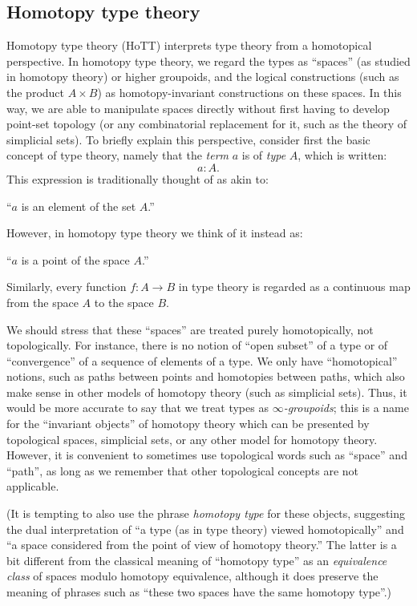 \subsection*{Homotopy type theory}

Homotopy type theory (HoTT) interprets type theory from a homotopical perspective.
In homotopy type theory, we regard the types as ``spaces'' (as studied in homotopy theory) or higher groupoids, and the logical constructions (such as the product $A\times B$) as homotopy-invariant constructions on these spaces.
In this way, we are able to manipulate spaces directly without first having to develop point-set topology (or any combinatorial replacement for it, such as the theory of simplicial sets).
To briefly explain this perspective, consider first the basic concept of type theory, namely that
the \emph{term} $a$ is of \emph{type} $A$, which is written:
\[ a:A. \]
This expression is traditionally thought of as akin to:
\begin{center}
``$a$ is an element of the set $A$.''
\end{center}
However, in homotopy type theory we think of it instead as:
\begin{center}
``$a$ is a point of the space $A$.''
\end{center}
%
Similarly, every function $f : A\to B$ in type theory is regarded as a continuous map from the space $A$ to the space $B$.

We should stress that these ``spaces'' are treated purely homotopically, not topologically.
For instance, there is no notion of ``open subset'' of a type or of ``convergence'' of a sequence of elements of a type.
We only have ``homotopical'' notions, such as paths between points and homotopies between paths, which also make sense in other models of homotopy theory (such as simplicial sets).
Thus, it would be more accurate to say that we treat types as \emph{$\infty$-groupoids}; this is a name for the ``invariant objects'' of homotopy theory which can be presented by topological spaces,
%
simplicial sets, or any other model for homotopy theory.
However, it is convenient to sometimes use topological words such as ``space'' and ``path'', as long as we remember that other topological concepts are not applicable.

(It is tempting to also use the phrase \emph{homotopy type}
%
for these objects, suggesting the dual interpretation of ``a type (as in type theory) viewed homotopically'' and ``a space considered from the point of view of homotopy theory.''
The latter is a bit different from the classical meaning of ``homotopy type'' as an \emph{equivalence class} of spaces modulo homotopy equivalence, although it does preserve the meaning of phrases such as ``these two spaces have the same homotopy type''.)

